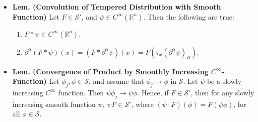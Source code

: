 \documentclass{article}
\begin{document}
\begin{itemize}
	{\color{orange}
		Let us fix $F \in \mathcal{S}'$. We recall that $\mathcal{S}'$ is a Fr\'echet space under the topology induced by the seminorms, 
			\begin{equation}
				p_{N,M}(\phi) \coloneqq \sum_{|\alpha| \leq M}\sup_{x \in \mathbb{R}^{n}}(1 + |x|)^{N}|\partial^{\alpha}\phi(x)|. 
			\end{equation}
		Since $F$ is a continuous linear functional, it follows that there exists a finite collection of seminorms $\{p_{N_{1}^{(j)}, N_{2}^{(j)}}(\phi)\}_{j = 1}^{m}$ and $C' > 0$ so that for all $\phi \in \mathcal{S}$, one has 
			\begin{equation}
				|F(\phi)| \leq C' \cdot \sum_{j = 1}^{m}p_{N_{1}^{(j)},N_{2}^{(j)}}(\phi). 
			\end{equation}
		Set $N_{1} = \max\{N_{1}^{(j)}\}$ and $N_{2} = \max\{N_{2}^{(j)}\}$. We note that for each $j$, $p_{N_{1}^{(j)}, N_{2}^{(j)}}(\phi)\leq p_{N_{1}, N_{2}}(\phi)$. Hence, we have 
			\begin{equation}
				|F(\phi)| \leq C' \cdot m \cdot p_{N_{1}, N_{2}}(\phi) \eqqcolon Cp_{N_{1},N_{2}}(\phi) = C \cdot \sum_{|\alpha|\leq N_{2}}\sup_{x \in \mathbb{R}^{n}}(1 + |x|)^{N_{1}}|\partial^{\alpha}\phi(x)|. 
			\end{equation}
		Evidently, this bound can be taken to be the definition of a tempered distribution. 
	}
	
	\item \textbf{Lem. (Convolution of Tempered Distribution with Smooth Function)} Let $F \in \mathcal{S}'$, and $\psi \in C^{\infty}(\mathbb{R}^{n})$. Then the following are true: \vspace{-0.25cm}
		\begin{enumerate}[itemsep =-2pt,label = (\arabic{*})]
			\item $F \ast \psi \in C^{\infty}(\mathbb{R}^{n})$. 
			\item $\partial^{\alpha}(F \ast \psi)(x) = (F \ast \partial^{\alpha}\psi)(x) = F(\tau_{x}(\partial^{\alpha}\psi)_{R})$. 
		\end{enumerate}
	
	\item \textbf{Lem. (Convergence of Product by Smoothly Increasing $C^{\infty}$-Function)} Let $\phi_{j}, \phi \in \mathcal{S}$, and assume that $\phi_{j} \to \phi$ in $\mathcal{S}$. Let $\psi$ be a slowly increasing $C^{\infty}$ function. Then $\psi \phi_{j} \to \psi \phi$. Hence, if $F \in \mathcal{S}'$, then for any slowly increasing smooth function $\psi$, $\psi F \in \mathcal{S}'$, where $(\psi \cdot F)(\phi) = F(\psi\phi)$, for all $\phi \in \mathcal{S}$. 
	

\end{itemize}
\end{document}
